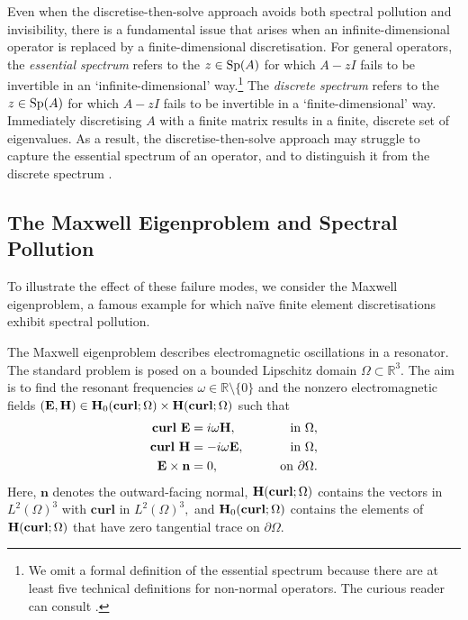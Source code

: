 Even when the discretise-then-solve approach avoids both spectral pollution and invisibility, there is a fundamental issue that arises when an infinite-dimensional \mbox{operator} is replaced by a finite-dimensional discretisation. For general operators, the \textit{essential spectrum} refers to the $z \in \operatorname{Sp}\!\left(A\right)$ for which $A-zI$ fails to be invertible in an `infinite-dimensional' way.\footnote{We omit a formal definition of the essential spectrum because there are at least five technical definitions for non-normal operators. The curious reader can consult \cite[Chapter~8]{Matt}.} The \textit{discrete spectrum} refers to the $z \in \operatorname{Sp}\!\left(A\right)$ for which $A-zI$ fails to be invertible in a `finite-dimensional' way. 
Immediately discretising $A$ with a finite matrix results in a finite, discrete set of eigenvalues. As a result, the discretise-then-solve approach may struggle to capture the essential spectrum of an operator, and to distinguish it from the discrete spectrum \cite[Section~1.1]{Matt}.  

\subsection{The Maxwell Eigenproblem and Spectral Pollution}\label{Maxwell Sect}


To illustrate the effect of these failure modes, we consider the Maxwell eigenproblem, a famous example for which na\"{i}ve finite element discretisations exhibit spectral pollution. 

The Maxwell eigenproblem describes electromagnetic oscillations in a resonator. The standard problem is posed on a bounded Lipschitz domain $\Omega \subset \mathbb{R}^3.$ The aim is to find the resonant frequencies $\omega \in \mathbb{R}\setminus\{0\}$ and the nonzero electromagnetic fields $(\mathbf{E}, \mathbf{H}) \in \mathbf{H}_0(\operatorname{\mathbf{curl}};\Omega) \times \mathbf{H}(\operatorname{\mathbf{curl}};\Omega)$ such that
\begin{subequations}\label{3D Max}
\begin{align}
    \operatorname{\mathbf{curl}} \, \mathbf{E} &= i \omega \mathbf{H}, \qquad &\text{in } \Omega,\label{eq:system-a}\\
    \operatorname{\mathbf{curl}} \, \mathbf{H} &= -i \omega \mathbf{E}, \qquad &\text{in } \Omega,\label{eq:system-b}\\
    \mathbf{E} \times \mathbf{n} &= 0, \qquad &\text{on } \partial \Omega. \label{eq:system-c}
\end{align}
\end{subequations}
Here, $\mathbf{n}$ denotes the outward-facing normal, $\mathbf{H}(\operatorname{\mathbf{curl}};\Omega)$ contains the vectors in $L^2(\Omega)^3$ with $\mathbf{curl}$ in $L^2(\Omega)^3,$ and $\mathbf{H}_0(\operatorname{\mathbf{curl}};\Omega)$ contains the elements of $\mathbf{H}(\operatorname{\mathbf{curl}};\Omega)$ that have zero tangential trace on $\partial \Omega.$ 

